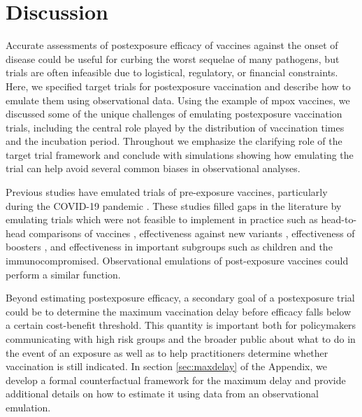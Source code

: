\documentclass[11pt]{article}
\begin{document}
\section{Discussion} \label{sec:discussion}
Accurate assessments of postexposure efficacy of vaccines against the onset of disease could be useful for curbing the worst sequelae of many pathogens, but trials are often infeasible due to logistical, regulatory, or financial constraints. Here, we specified target trials for postexposure vaccination and describe how to emulate them using observational data. Using the example of mpox vaccines, we discussed some of the unique challenges of emulating postexposure vaccination trials, including the central role played by the distribution of vaccination times and the incubation period. Throughout we emphasize the clarifying role of the target trial framework and conclude with simulations showing how emulating the trial can help avoid several common biases in observational analyses. 

Previous studies have emulated trials of pre-exposure vaccines, particularly during the COVID-19 pandemic \cite{dagan_bnt162b2_2021,dickerman_comparative_2022,cohen-stavi_bnt162b2_2022,barda_effectiveness_2021}. These studies filled gaps in the literature by emulating trials which were not feasible to implement in practice such as head-to-head comparisons of vaccines \cite{dickerman_comparative_2022}, effectiveness against new variants \cite{cohen-stavi_bnt162b2_2022}, effectiveness of boosters \cite{barda_effectiveness_2021,magen_fourth_2022}, and effectiveness in important subgroups such as children \cite{cohen-stavi_bnt162b2_2022} and the immunocompromised. Observational emulations of post-exposure vaccines could perform a similar function.
 

Beyond estimating postexposure efficacy, a secondary goal of a postexposure trial could be to determine the maximum vaccination delay before efficacy falls below a certain cost-benefit threshold. This quantity is important both for policymakers communicating with high risk groups and the broader public about what to do in the event of an exposure as well as to help practitioners determine whether vaccination is still indicated. In section \ref{sec:maxdelay} of the Appendix, we develop a formal counterfactual framework for the maximum delay and provide additional details on how to estimate it using data from an observational emulation.
\end{document}
